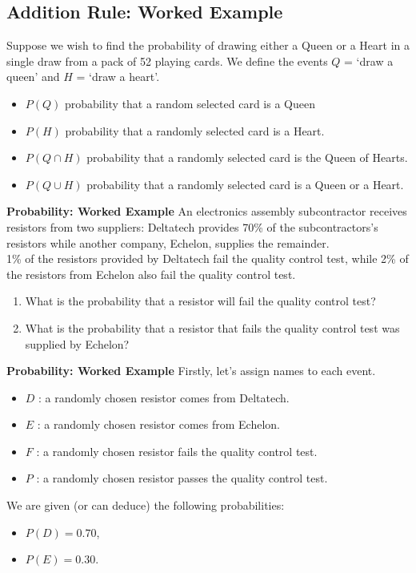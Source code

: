 \documentclass[]{report}
\begin{document}
\subsection{Addition Rule: Worked Example}
Suppose we wish to find the probability of drawing either a Queen or a Heart
in a single draw from a pack of 52 playing cards. We define the events $Q$ =
`draw a queen' and $H$ = `draw a heart'.
\begin{itemize}
	\item $P(Q)$ probability that a random selected card is a Queen
	\item  $P(H)$ probability that a randomly selected card is a Heart.
	\item  $P(Q\cap H)$ probability that a randomly selected card is the Queen of
	Hearts.
	\item  $P(Q\cup H)$ probability that a randomly selected card is a Queen or a Heart.
\end{itemize}



\noindent \textbf{Probability: Worked Example }
An electronics assembly subcontractor receives resistors from two suppliers: Deltatech provides
70\% of the subcontractors's resistors while another company, Echelon, supplies the remainder.
\\
1\% of the resistors provided by Deltatech fail the quality control test, while 2\% of the
resistors from Echelon also fail the quality control test.

\begin{enumerate}
	\item What is the probability that a resistor will fail the quality control test?
	\item What is the probability that a resistor that fails the quality control test was supplied by Echelon?
\end{enumerate}


\noindent \textbf{Probability: Worked Example}
Firstly, let's assign names to each event.
\begin{itemize}
	\item $D$ : a randomly chosen resistor comes from Deltatech.
	\item $E$ : a randomly chosen resistor comes from Echelon.
	\item $F$ : a randomly chosen resistor fails the quality control test.
	\item $P$ : a randomly chosen resistor passes the quality control test.
\end{itemize}
\bigskip
We are given (or can deduce) the following probabilities:
\begin{itemize}
	\item $P(D) = 0.70$,
	\item $P(E) = 0.30$.
\end{itemize}
\end{document}
